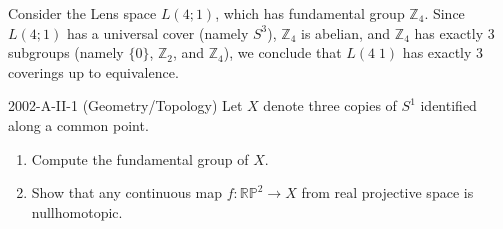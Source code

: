 \documentclass{article}
\begin{document}
\begin{solutions}
	Consider the Lens space $L(4;1)$, which has fundamental group $\mathbb{Z}_{4}$. Since $L(4;1)$ has a universal cover (namely $S^{3}$), $\mathbb{Z}_{4}$ is abelian, and $\mathbb{Z}_{4}$ has exactly 3 subgroups (namely $\{0\}$, $\mathbb{Z}_{2}$, and $\mathbb{Z}_{4}$), we conclude that $L(4\;1)$ has exactly 3 coverings up to equivalence. 
\end{solutions} 
\begin{prb}{2002-A-II-1 (Geometry/Topology)}
	Let $X$ denote three copies of $S^{1}$ identified along a common point. \vspace{-0.35cm}
		\begin{enumerate}[itemsep =-2pt,label = (\roman{*})]
			\item Compute the fundamental group of $X$. 
			\item Show that any continuous map $f: \mathbb{RP}^{2} \to X$ from real projective space is nullhomotopic. 
		\end{enumerate}
\end{prb}
\end{document}
